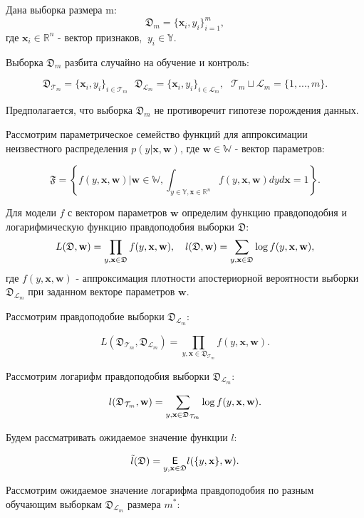 \documentclass[12pt,twoside]{article}
\begin{document}
Дана выборка размера m:
$$
\mathfrak D_m = \{\textbf{x}_i, y_i\}_{i=1}^m,
$$
где $\textbf{x}_i \in \mathbb{R}^{n}$ - вектор признаков, $~y_i \in \mathbb{Y}$.

Выборка $\mathfrak D_m$ разбита случайно на обучение и контроль:

$$
\mathfrak D_{\mathcal T_m} = \{\textbf{x}_i, y_i\}_{i \in \mathcal T_m} ~~~ \mathfrak D_{\mathcal L_m} = \{\textbf{x}_i, y_i\}_{i \in \mathcal L_m}, ~~~ \mathcal T_m \sqcup \mathcal L_m = \{1, ..., m\}. 
$$

Предполагается, что выборка $\mathfrak D_m$ не противоречит гипотезе порождения данных.

Рассмотрим параметрическое семейство функций для аппроксимации неизвестного распределения $p(y | \textbf{x}, \textbf{w})$, где $\textbf{w} \in \mathbb{W}$ - вектор параметров:

$$
\mathfrak{F} = \left\{f(y, \textbf{x}, \textbf{w}) | \textbf{w} \in \mathbb{W}, \int_{y \in \mathbb{Y}, \textbf{x} \in \mathbb{R}^n} f(y, \textbf{x}, \textbf{w})dyd\textbf{x} = 1\right\}.
$$

Для модели $f$ с вектором параметров $\textbf{w}$ определим функцию правдоподобия и логарифмическую функцию правдоподобия выборки $\mathfrak D$:
$$
L(\mathfrak{D}, \textbf{w}) = \prod_{y, \textbf{x} \in \mathfrak D} f(y, \textbf{x}, \textbf{w}),~~~ l(\mathfrak D, \textbf w) = \sum_{y, \textbf{x} \in \mathfrak D}\log f(y, \textbf{x}, \textbf{w}),
$$
где $f(y, \textbf{x}, \textbf{w})$ - аппроксимация плотности апостериорной вероятности выборки $\mathfrak D_{\mathcal L_m}$ при заданном векторе параметров $\textbf{w}$.

Рассмотрим правдоподобие выборки $\mathfrak D_{\mathcal L_m}$:

$$
L(\mathfrak D_{\mathcal T_m}, \mathfrak D_{\mathcal L_m}) = \prod_{y, \textbf{x} \in \mathfrak D_{\mathcal T_m}} f(y, \textbf{x},  \textbf{w}).
$$

Рассмотрим логарифм правдоподобия выборки $\mathfrak D_{\mathcal L_m}$:

$$
l(\mathfrak D_{\mathcal T_m}, \textbf w) = \sum_{y, \textbf{x} \in \mathfrak D_{\mathcal T_m}}\log f(y, \textbf{x}, \textbf{w}).
$$

Будем рассматривать ожидаемое значение функции $l$:

$$
\tilde{l}(\mathfrak D)  = \underset{y, \textbf{x} \in \mathfrak D}{\mathsf E} l(\{y, \textbf{x}\}, \textbf w).
$$

Рассмотрим ожидаемое значение логарифма правдоподобия по разным обучающим выборкам $\mathfrak D_{\mathcal L_m}$ размера $m^*$:
\end{document}
